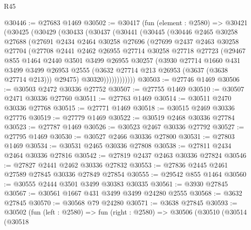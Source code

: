 \begin{lexlean}{R45}
\begin{coremodule}
@30446 := @27683 @1469
@30502 := @30417
    (fun (element : @2580) =>
    @30421
      (@30425
        (@30429
          (@30433
            (@30437
              (@30441
                (@30445
                  (@30446
                    @2465
                    @30258
                    @27688
                    (@27691
                      @2434
                      @2464
                      @30258
                      @27696
                      (@27699
                        @2437
                        @2463
                        @30258
                        @27704
                        (@27708
                          @2441
                          @2462
                          @26955
                          @27714
                          @30258
                          @27718
                          @27723
                          (@29467
                            @855
                            @1464
                            @2440
                            @3501
                            @3499
                            @26955
                            @30257
                            (@3930
                              @27714
                              @1660
                              @431
                              @3499
                              @3499
                              @26953
                              @2555
                              (@3632 @27714 @213 @26953 (@3637 (@3638 @27714 @213)))
                              @29475)
                            @30320))))))))))))
@30503 := @27746 @1469
@30506 := @30503 @2472 @30336 @27752
@30507 := @27755 @1469
@30510 := @30507 @2471 @30336 @27760
@30511 := @27763 @1469
@30514 := @30511 @2470 @30336 @27768
@30515 := @27771 @1469
@30518 := @30515 @2469 @30336 @27776
@30519 := @27779 @1469
@30522 := @30519 @2468 @30336 @27784
@30523 := @27787 @1469
@30526 := @30523 @2467 @30336 @27792
@30527 := @27795 @1469
@30530 := @30527 @2466 @30336 @27800
@30531 := @27803 @1469
@30534 := @30531 @2465 @30336 @27808
@30538 := @27811 @2434 @2464 @30336 @27816
@30542 := @27819 @2437 @2463 @30336 @27824
@30546 := @27827 @2441 @2462 @30336 @27832
@30553 := @27836 @2445 @2461 @27589 @27845 @30336 @27849 @27854
@30555 := @29542 @855 @1464
@30560 := @30555 @2444 @3501 @3499 @30383 @30335
@30561 := @3930 @27845
@30567 := @30561 @1667 @431 @3499 @3499 @24280 @2555
@30568 := @3632 @27845
@30570 := @30568 @79 @24280
@30571 := @3638 @27845
@30593 := @30502
    (fun (left : @2580) =>
    fun (right : @2580) =>
    @30506
      (@30510
        (@30514
          (@30518

\end{coremodule}
\end{lexlean}
